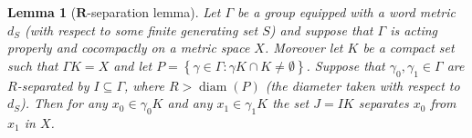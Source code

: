 \documentclass[12pt, a4paper]{article}
\newcommand{\8}{\infty}
\newcommand{\set}[1]{\left\{ #1 \right\}}
\DeclareMathOperator{\diam}{diam}
\theoremstyle{break}
\newtheorem{lm}[thm]{Lemma}
\theoremstyle{defbreak}
\begin{document}

\begin{lm}[$\mathbf{R}$-separation lemma] \label{corollary:R-separation_lemma}
    Let $\Gamma$ be a group equipped with a word metric $d_S$ (with respect to some finite generating set $S$) and suppose that $\Gamma$ is acting properly and cocompactly on a metric 
space $X$. Moreover let $K$ be a compact set such that $\Gamma K = X$ and let $P = \set{\gamma\in \Gamma:\gamma K\cap K \neq \emptyset}$. Suppose that $\gamma_0, \gamma_1\in \Gamma$ are $R$-separated by $I\subseteq \Gamma$, where $R > \diam(P)$
(the diameter taken with respect to $d_S$). Then for any $x_0\in \gamma_0 K$ and any $x_1\in \gamma_1K$ the set $J = IK$ separates $x_0$ from $x_1$ in $X$.
\end{lm}
\end{document}
